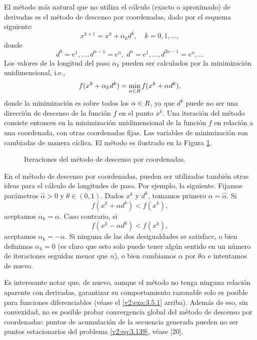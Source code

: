 El método más natural que no utiliza el cálculo (exacto o aproximado) de derivadas es el método de descenso por coordenadas, dado por el esquema siguiente:
\begin{equation}
    x^{k+1} = x^k + \alpha_k d^k, \quad k=0, 1, \dots,
    \label{v2:eq:3.141}
\end{equation}
donde
\[
    d^0 = e^1, \dots, d^{n-1} = e^n, \; d^n = e^1, \dots, d^{2n-1} = e^n, \dots
\]
Los valores de la longitud del paso $\alpha_k$ pueden ser calculados por la minimización unidimensional, i.e.,
\[
    f(x^k + \alpha_k d^k) = \min_{\alpha \in R} f(x^k + \alpha d^k),
\]
donde la minimización es sobre todos los $\alpha \in R$, ya que $d^k$ puede no ser una dirección de descenso de la función $f$ en el punto $x^k$. Una iteración del método consiste entonces en la minimización unidimensional de la función $f$ en relación a una coordenada, con otras coordenadas fijas. Las variables de minimización son cambiadas de manera cíclica. El método es ilustrado en la Figura \ref{v2:fig:3.5.1}.

\begin{figure}[htpb]
    \centering
    \caption{Iteraciones del método de descenso por coordenadas.}
    \label{v2:fig:3.5.1}
\end{figure}

En el método de descenso por coordenadas, pueden ser utilizadas también otras ideas para el cálculo de longitudes de paso. Por ejemplo, la siguiente. Fijamos parámetros $\hat{\alpha} > 0$ y $\theta \in (0, 1)$. Dados $x^k$ y $d^k$, tomamos primero $\alpha = \hat{\alpha}$. Si
\[
    f(x^k + \alpha d^k) < f(x^k),
\]
aceptamos $\alpha_k = \alpha$. Caso contrario, si
\[
    f(x^k - \alpha d^k) < f(x^k),
\]
aceptamos $\alpha_k = -\alpha$. Si ninguna de las dos desigualdades se satisface, o bien definimos $\alpha_k = 0$ (es claro que esto solo puede tener algún sentido en un número de iteraciones seguidas menor que $n$), o bien cambiamos $\alpha$ por $\theta\alpha$ e intentamos de nuevo.

Es interesante notar que, de nuevo, aunque el método no tenga ninguna relación aparente con derivadas, garantizar su comportamiento razonable solo es posible para funciones diferenciables (véase el \cref{v2:exa:3.5.1} arriba). Además de eso, sin convexidad, no es posible probar convergencia global del método de descenso por coordenadas: puntos de acumulación de la secuencia generada pueden no ser puntos estacionarios del problema \eqref{v2:eq:3.139}, véase [20].

